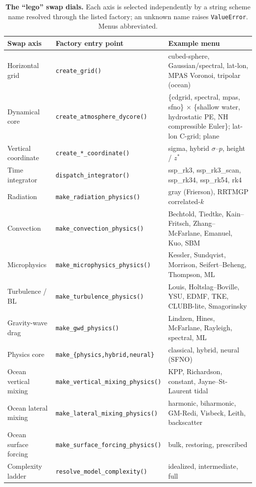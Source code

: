 \documentclass[11pt,a4paper]{article}
\begin{document}
\begin{table}[t]
\centering
\footnotesize
\caption{\textbf{The ``lego'' swap dials.} Each axis is selected independently by
a string scheme name resolved through the listed factory; an unknown name raises
\texttt{ValueError}. Menus abbreviated.}
\label{tab:dials}
\begin{tabular}{@{}p{2.9cm}p{4.4cm}p{7.2cm}@{}}
\toprule
\textbf{Swap axis} & \textbf{Factory entry point} & \textbf{Example menu} \\
\midrule
Horizontal grid & \texttt{create\_grid()} & cubed-sphere, Gaussian/spectral, lat-lon, MPAS Voronoi, tripolar (ocean) \\
Dynamical core & \texttt{create\_atmosphere\_dycore()} & \{cdgrid, spectral, mpas, sfno\} $\times$ \{shallow water, hydrostatic PE, NH compressible Euler\}; lat-lon C-grid; plane \\
Vertical coordinate & \texttt{create\_*\_coordinate()} & sigma, hybrid $\sigma$--$p$, height / $z^*$ \\
Time integrator & \texttt{dispatch\_integrator()} & ssp\_rk3, ssp\_rk3\_scan, ssp\_rk34, ssp\_rk54, rk4 \\
Radiation & \texttt{make\_radiation\_physics()} & gray (Frierson), RRTMGP correlated-$k$ \\
Convection & \texttt{make\_convection\_physics()} & Bechtold, Tiedtke, Kain--Fritsch, Zhang--McFarlane, Emanuel, Kuo, SBM \\
Microphysics & \texttt{make\_microphysics\_physics()} & Kessler, Sundqvist, Morrison, Seifert--Beheng, Thompson, ML \\
Turbulence / BL & \texttt{make\_turbulence\_physics()} & Louis, Holtslag--Boville, YSU, EDMF, TKE, CLUBB-lite, Smagorinsky \\
Gravity-wave drag & \texttt{make\_gwd\_physics()} & Lindzen, Hines, McFarlane, Rayleigh, spectral, ML \\
Physics core & \texttt{make\_\{physics,hybrid,neural\}} & classical, hybrid, neural (SFNO) \\
Ocean vertical mixing & \texttt{make\_vertical\_mixing\_physics()} & KPP, Richardson, constant, Jayne--St-Laurent tidal \\
Ocean lateral mixing & \texttt{make\_lateral\_mixing\_physics()} & harmonic, biharmonic, GM-Redi, Visbeck, Leith, backscatter \\
Ocean surface forcing & \texttt{make\_surface\_forcing\_physics()} & bulk, restoring, prescribed \\
Complexity ladder & \texttt{resolve\_model\_complexity()} & idealized, intermediate, full \\
\bottomrule
\end{tabular}
\end{table}
\end{document}
